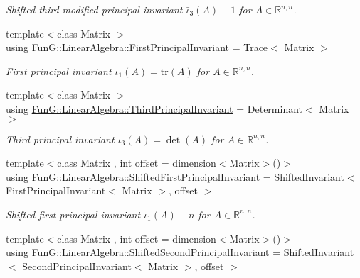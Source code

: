 \begin{DoxyCompactItemize}
\begin{DoxyCompactList}\small\item\em Shifted third modified principal invariant $ \bar\iota_3(A) - 1 $ for $ A\in\mathbb{R}^{n,n} $. \end{DoxyCompactList}\item 
\hypertarget{group__InvariantGroup_ga9df73a7e52fc731402c4aa5647542f33}{{\footnotesize template$<$class Matrix $>$ }\\using \hyperlink{group__InvariantGroup_ga9df73a7e52fc731402c4aa5647542f33}{Fun\-G\-::\-Linear\-Algebra\-::\-First\-Principal\-Invariant} = Trace$<$ Matrix $>$}\label{group__InvariantGroup_ga9df73a7e52fc731402c4aa5647542f33}

\begin{DoxyCompactList}\small\item\em First principal invariant $ \iota_1(A)=\mathrm{tr}(A) $ for $A\in\mathbb{R}^{n,n}$. \end{DoxyCompactList}\item 
\hypertarget{group__InvariantGroup_ga264362baf2876d506a53d007149c7838}{{\footnotesize template$<$class Matrix $>$ }\\using \hyperlink{group__InvariantGroup_ga264362baf2876d506a53d007149c7838}{Fun\-G\-::\-Linear\-Algebra\-::\-Third\-Principal\-Invariant} = Determinant$<$ Matrix $>$}\label{group__InvariantGroup_ga264362baf2876d506a53d007149c7838}

\begin{DoxyCompactList}\small\item\em Third principal invariant $ \iota_3(A)=\det(A) $ for $A\in\mathbb{R}^{n,n}$. \end{DoxyCompactList}\item 
\hypertarget{group__InvariantGroup_ga969c3c1b1574de05ef1429c6976996e0}{{\footnotesize template$<$class Matrix , int offset = dimension$<$\-Matrix$>$()$>$ }\\using \hyperlink{group__InvariantGroup_ga969c3c1b1574de05ef1429c6976996e0}{Fun\-G\-::\-Linear\-Algebra\-::\-Shifted\-First\-Principal\-Invariant} = Shifted\-Invariant$<$ First\-Principal\-Invariant$<$ Matrix $>$, offset $>$}\label{group__InvariantGroup_ga969c3c1b1574de05ef1429c6976996e0}

\begin{DoxyCompactList}\small\item\em Shifted first principal invariant $ \iota_1(A) - n $ for $ A\in\mathbb{R}^{n,n} $. \end{DoxyCompactList}\item 
\hypertarget{group__InvariantGroup_ga2bb5e7f197d6e66389d0513116c7887d}{{\footnotesize template$<$class Matrix , int offset = dimension$<$\-Matrix$>$()$>$ }\\using \hyperlink{group__InvariantGroup_ga2bb5e7f197d6e66389d0513116c7887d}{Fun\-G\-::\-Linear\-Algebra\-::\-Shifted\-Second\-Principal\-Invariant} = Shifted\-Invariant$<$ Second\-Principal\-Invariant$<$ Matrix $>$, offset $>$}\label{group__InvariantGroup_ga2bb5e7f197d6e66389d0513116c7887d}


\end{DoxyCompactItemize}
